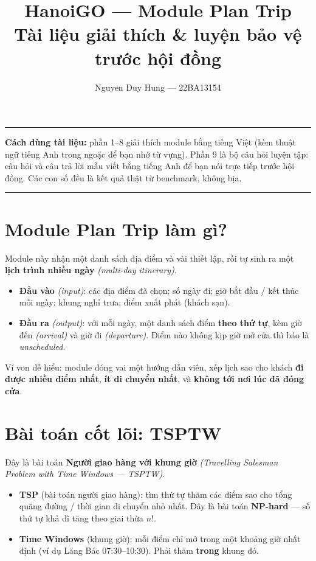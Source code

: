 \documentclass[12pt,a4paper]{article}
\title{\textbf{HanoiGO --- Module Plan Trip}\\[4pt]
\large Tài liệu giải thích \& luyện bảo vệ trước hội đồng}
\author{Nguyen Duy Hung --- 22BA13154}
\date{}
\newcommand{\en}[1]{\textit{(#1)}}            %
\begin{document}
\maketitle
\hrule
\medskip

\textbf{Cách dùng tài liệu:} phần 1--8 giải thích module bằng tiếng Việt (kèm
thuật ngữ tiếng Anh trong ngoặc để bạn nhớ từ vựng). Phần 9 là bộ câu hỏi luyện
tập: câu hỏi và câu trả lời mẫu viết bằng tiếng Anh để bạn nói trực tiếp trước
hội đồng. Các con số đều là kết quả thật từ benchmark, không bịa.

\tableofcontents
\medskip\hrule

\section{Module Plan Trip làm gì?}

Module này nhận một danh sách địa điểm và vài thiết lập, rồi tự sinh ra một
\textbf{lịch trình nhiều ngày} \en{multi-day itinerary}.

\begin{itemize}[nosep]
  \item \textbf{Đầu vào} \en{input}: các địa điểm đã chọn; số ngày đi; giờ bắt
  đầu / kết thúc mỗi ngày; khung nghỉ trưa; điểm xuất phát (khách sạn).
  \item \textbf{Đầu ra} \en{output}: với mỗi ngày, một danh sách điểm \textbf{theo
  thứ tự}, kèm giờ đến \en{arrival} và giờ đi \en{departure}. Điểm nào không kịp
  giờ mở cửa thì báo là \textit{unscheduled}.
\end{itemize}

Ví von dễ hiểu: module đóng vai một hướng dẫn viên, xếp lịch sao cho khách
\textbf{đi được nhiều điểm nhất}, \textbf{ít di chuyển nhất}, và \textbf{không
tới nơi lúc đã đóng cửa}.

\section{Bài toán cốt lõi: TSPTW}

Đây là bài toán \textbf{Người giao hàng với khung giờ} \en{Travelling Salesman
Problem with Time Windows --- TSPTW}.

\begin{itemize}[nosep]
  \item \textbf{TSP} (bài toán người giao hàng): tìm thứ tự thăm các điểm sao cho
  tổng quãng đường / thời gian di chuyển nhỏ nhất. Đây là bài toán
  \textbf{NP-hard} --- số thứ tự khả dĩ tăng theo giai thừa $n!$.
  \item \textbf{Time Windows} (khung giờ): mỗi điểm chỉ mở trong một khoảng giờ
  nhất định (ví dụ Lăng Bác 07:30--10:30). Phải thăm \textbf{trong} khung đó.
\end{itemize}
\end{document}

